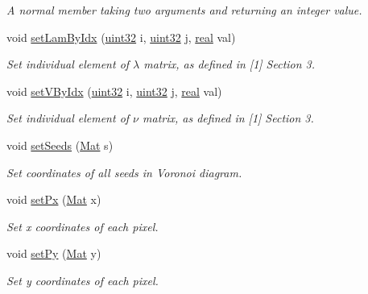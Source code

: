 \begin{DoxyCompactItemize}
\begin{DoxyCompactList}\small\item\em A normal member taking two arguments and returning an integer value. \end{DoxyCompactList}\item 
void \mbox{\hyperlink{classvd_a8df228a05762e0c0a2bccc28094a1f92}{set\+Lam\+By\+Idx}} (\mbox{\hyperlink{typedefs_8h_a8ad23e2333787a214e20a58a284a5a60}{uint32}} i, \mbox{\hyperlink{typedefs_8h_a8ad23e2333787a214e20a58a284a5a60}{uint32}} j, \mbox{\hyperlink{typedefs_8h_a58a0c7cf2501f4492da833421be92547}{real}} val)
\begin{DoxyCompactList}\small\item\em Set individual element of $\lambda$ matrix, as defined in \mbox{[}1\mbox{]} Section 3. \end{DoxyCompactList}\item 
void \mbox{\hyperlink{classvd_a29670919bb8d5b2f2f0235ddfda6484e}{set\+V\+By\+Idx}} (\mbox{\hyperlink{typedefs_8h_a8ad23e2333787a214e20a58a284a5a60}{uint32}} i, \mbox{\hyperlink{typedefs_8h_a8ad23e2333787a214e20a58a284a5a60}{uint32}} j, \mbox{\hyperlink{typedefs_8h_a58a0c7cf2501f4492da833421be92547}{real}} val)
\begin{DoxyCompactList}\small\item\em Set individual element of $\nu$ matrix, as defined in \mbox{[}1\mbox{]} Section 3. \end{DoxyCompactList}\item 
void \mbox{\hyperlink{classvd_a739318bbb45d4facfcc1899c71b91720}{set\+Seeds}} (\mbox{\hyperlink{typedefs_8h_a9fa28c1f74e909474857584f5c7b0088}{Mat}} s)
\begin{DoxyCompactList}\small\item\em Set coordinates of all seeds in Voronoi diagram. \end{DoxyCompactList}\item 
void \mbox{\hyperlink{classvd_a579df0c885a43bb876449889bbcba6cb}{set\+Px}} (\mbox{\hyperlink{typedefs_8h_a9fa28c1f74e909474857584f5c7b0088}{Mat}} x)
\begin{DoxyCompactList}\small\item\em Set x coordinates of each pixel. \end{DoxyCompactList}\item 
void \mbox{\hyperlink{classvd_a8314de29eacf72f10afee2c67b0c9819}{set\+Py}} (\mbox{\hyperlink{typedefs_8h_a9fa28c1f74e909474857584f5c7b0088}{Mat}} y)
\begin{DoxyCompactList}\small\item\em Set y coordinates of each pixel. \end{DoxyCompactList}\item 

\end{DoxyCompactItemize}
